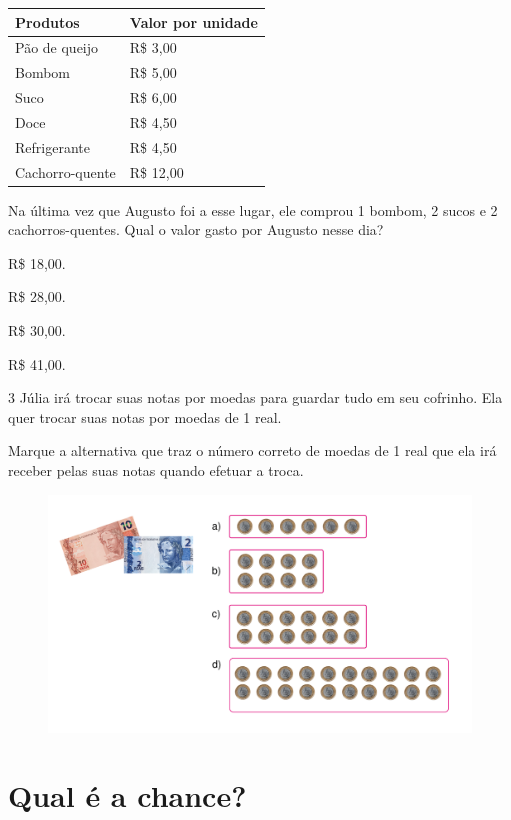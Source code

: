 \begin{longtable}[]{@{}ll@{}}
\toprule
\hline
\textbf{Produtos} & \textbf{Valor por unidade}\tabularnewline
\hline
\midrule
\endhead
Pão de queijo & R\$ 3,00\tabularnewline
\hline
Bombom & R\$ 5,00\tabularnewline
\hline
Suco & R\$ 6,00\tabularnewline
\hline
Doce & R\$ 4,50\tabularnewline
\hline
Refrigerante & R\$ 4,50\tabularnewline
\hline
Cachorro-quente & R\$ 12,00\tabularnewline
\bottomrule
\end{longtable}

Na última vez que Augusto foi a esse lugar, ele comprou 1 bombom, 2
sucos e 2 cachorros-quentes. Qual o valor gasto por Augusto nesse dia?

\begin{escolha}

\item
  R\$ 18,00.
\item
  R\$ 28,00.
\item
  R\$ 30,00.
\item
  R\$ 41,00.
\end{escolha}

\num{3} Júlia irá trocar suas notas por moedas para guardar tudo em seu
cofrinho. Ela quer trocar suas notas por moedas de 1 real.

Marque a
alternativa que traz o número correto de moedas de 1 real que ela
irá receber pelas suas notas quando efetuar a troca.

\begin{figure}[htpb!]
\centering
\includegraphics[width=\textwidth]{./media/image74.png}
\end{figure}

\chapter{Qual é a chance?}

